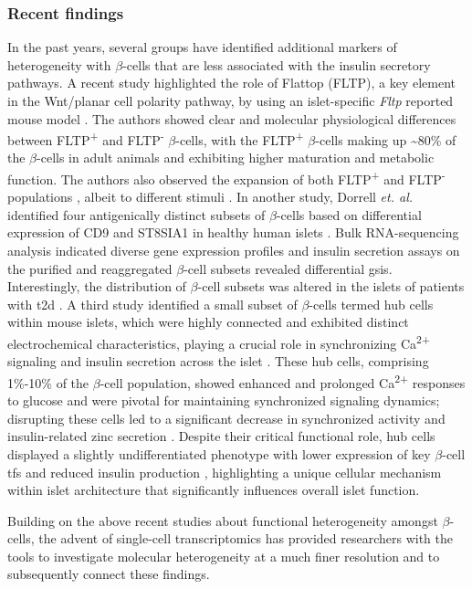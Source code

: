 \subsubsection{Recent findings}
In the past years, several groups have identified additional markers of heterogeneity with $\beta$-cells that are less associated with the insulin secretory pathways. A recent study highlighted the role of Flattop (FLTP), a key element in the Wnt/planar cell polarity pathway, by using an islet-specific \textit{Fltp} reported mouse model \textbf{\cite{bader_identification_2016,roscioni_impact_2016}}. The authors showed clear and molecular physiological differences between FLTP\textsuperscript{+} and FLTP\textsuperscript{-} $\beta$-cells, with the FLTP\textsuperscript{+} $\beta$-cells making up \textasciitilde80\% of the $\beta$-cells in adult animals and exhibiting higher maturation and metabolic function. The authors also observed the expansion of both FLTP\textsuperscript{+} and FLTP\textsuperscript{-} populations , albeit to different stimuli \textbf{\cite{bader_identification_2016}}. In another study, Dorrell \textit{et. al.} identified four antigenically distinct subsets of $\beta$-cells based on differential expression of CD9 and ST8SIA1 in healthy human islets \textbf{\cite{dorrell_human_2016}}. Bulk RNA-sequencing analysis indicated diverse gene expression profiles and insulin secretion assays on the purified and reaggregated $\beta$-cell subsets revealed differential \gls{gsis}. Interestingly, the distribution of $\beta$-cell subsets was altered in the islets of patients with \gls{t2d} \textbf{\cite{dorrell_human_2016}}. A third study identified a small subset of $\beta$-cells termed hub cells within mouse islets, which were highly connected and exhibited distinct electrochemical characteristics, playing a crucial role in synchronizing Ca\textsuperscript{2+} signaling and insulin secretion across the islet \textbf{\cite{johnston_beta_2016}}. These hub cells, comprising 1\%-10\% of the $\beta$-cell population, showed enhanced and prolonged Ca\textsuperscript{2+} responses to glucose and were pivotal for maintaining synchronized signaling dynamics; disrupting these cells led to a significant decrease in synchronized activity and insulin-related zinc secretion \textbf{\cite{johnston_beta_2016}}. Despite their critical functional role, hub cells displayed a slightly undifferentiated phenotype with lower expression of key $\beta$-cell \glspl{tf} and reduced insulin production \textbf{\cite{johnston_beta_2016}}, highlighting a unique cellular mechanism within islet architecture that significantly influences overall islet function.\\
\par Building on the above recent studies about functional heterogeneity amongst $\beta$-cells, the advent of single-cell transcriptomics has provided researchers with the tools to investigate molecular heterogeneity at a much finer resolution and to subsequently connect these findings.

